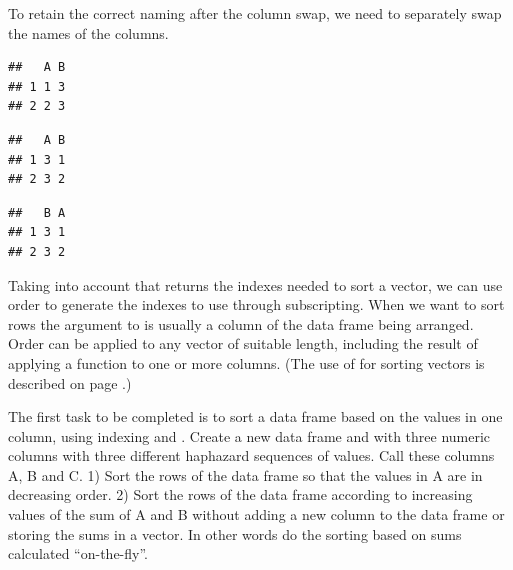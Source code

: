 \documentclass[krantz2]{krantz}\usepackage{knitr}%
\begin{document}
To retain the correct naming after the column swap, we need to separately swap the names of the columns.
\begin{knitrout}\footnotesize
{}\color{fgcolor}\begin{kframe}
\begin{alltt}
 \hlkwb{<-} \hlstd{(} \hlstd{=} \hlopt{:}\hlstd{,}  \hlstd{=} \hlstd{)}
 \hlstd{)}
\end{alltt}
\begin{verbatim}
##   A B
## 1 1 3
## 2 2 3
\end{verbatim}
\begin{alltt}
\hlstd{my_data_frame.df[ ,} \hlopt{:}\hlstd{]} \hlkwb{<-} \hlstd{my_data_frame.df[ ,} \hlopt{:}\hlstd{]}
 \hlstd{)}
\end{alltt}
\begin{verbatim}
##   A B
## 1 3 1
## 2 3 2
\end{verbatim}
\begin{alltt}
\hlstd{(my_data_frame.df)[}\hlopt{:}\hlstd{]} \hlkwb{<-} \hlstd{(my_data_frame.df)[}\hlopt{:}\hlstd{]}
 \hlstd{)}
\end{alltt}
\begin{verbatim}
##   B A
## 1 3 1
## 2 3 2
\end{verbatim}
\end{kframe}
\end{knitrout}

Taking into account that  returns the indexes needed to sort a vector, we can use order to generate the indexes to use through subscripting. When we want to sort rows the argument to  is usually a column of the data frame being arranged. Order can be applied to any vector of suitable length, including the result of applying a function to one or more columns. (The use of  for sorting vectors is described on page \pageref{box:vec:sort}.)

\begin{playground}
The first task to be completed is to sort a data frame based on the values in one column, using indexing and . Create a new data frame and with three numeric columns with three different haphazard sequences of values. Call these columns A, B and C. 1) Sort the rows of the data frame so that the values in A are in decreasing order. 2) Sort the rows of the data frame according to increasing values of the sum of A and B without adding a new column to the data frame or storing the sums in a vector. In other words do the sorting based on sums calculated ``on-the-fly''.
\end{playground}
\end{document}
